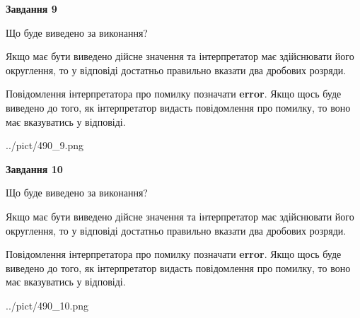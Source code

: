 \documentclass[12pt, ukrainian]{article}
\begin{document}
{\begin {Large}
{\begin {center}\textbf{Завдання 9}\end {center}}\par
Що буде виведено за виконання? \par

Якщо має бути виведено дійсне значення та інтерпретатор має здійснювати його округлення, 
то у відповіді достатньо правильно вказати два дробових розряди.

Повідомлення інтерпретатора про помилку позначати \textbf{error}.
Якщо щось буде виведено до того, як інтерпретатор видасть повідомлення про помилку, 
то воно має вказуватись у відповіді. \par

\begin{center}
	{../pict/490_9.png}
\end{center}
\newpage

{\begin {center}\textbf{Завдання 10}\end {center}}\par
Що буде виведено за виконання? \par

Якщо має бути виведено дійсне значення та інтерпретатор має здійснювати його округлення, 
то у відповіді достатньо правильно вказати два дробових розряди.

Повідомлення інтерпретатора про помилку позначати \textbf{error}.
Якщо щось буде виведено до того, як інтерпретатор видасть повідомлення про помилку, 
то воно має вказуватись у відповіді. \par

\begin{center}
	{../pict/490_10.png}
\end{center}
\newpage

\end {Large}}
\end{document}
